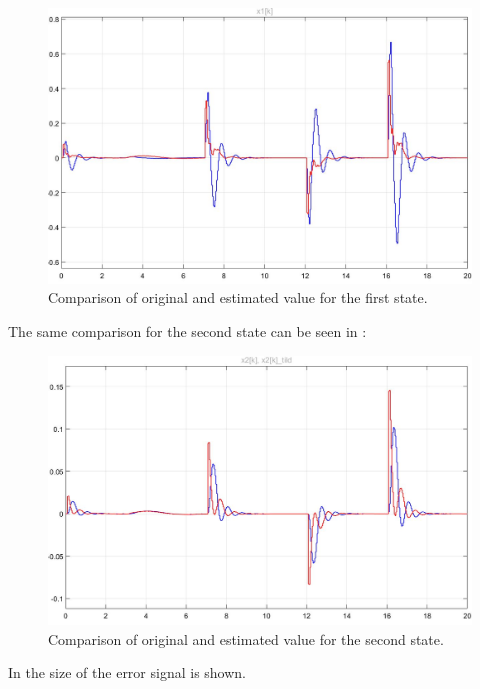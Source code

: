 \begin{figure}[H]
\centering
\includegraphics[width=1\textwidth]{rapport/billeder/temporary/state1}
\caption{Comparison of original and estimated value for the first state.}
\label{fig:state1}
\end{figure}

The same comparison for the second state can be seen in : 

\begin{figure}[H]
\centering
\includegraphics[width=1\textwidth]{rapport/billeder/temporary/state2}
\caption{Comparison of original and estimated value for the second state.}
\label{fig:state2}
\end{figure}

In  the size of the error signal is shown.

